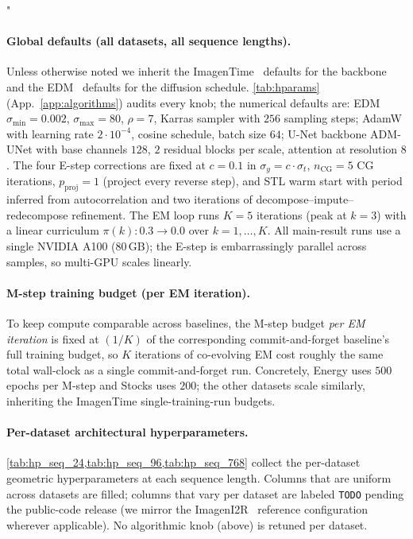 "\documentclass{article}
\theoremstyle{plain}
\theoremstyle{definition}
\theoremstyle{remark}
\begin{document}
\paragraph{Global defaults (all datasets, all sequence lengths).}
Unless otherwise noted we inherit the ImagenTime~\citep{naiman2024imagentime} defaults for the backbone and the EDM~\citep{karras2022edm} defaults for the diffusion schedule. \cref{tab:hparams} (App.~\ref{app:algorithms}) audits every knob; the numerical defaults are: EDM $\sigma_{\min}=0.002$, $\sigma_{\max}=80$, $\rho=7$, Karras sampler with $256$ sampling steps; AdamW with learning rate $2\cdot 10^{-4}$, cosine schedule, batch size $64$; U-Net backbone ADM-UNet with base channels $128$, $2$ residual blocks per scale, attention at resolution $8$. The four E-step corrections are fixed at $c = 0.1$ in $\sigma_y = c \cdot \sigma_t$, $n_{\mathrm{CG}} = 5$ CG iterations, $p_{\mathrm{proj}} = 1$ (project every reverse step), and STL warm start with period inferred from autocorrelation and two iterations of decompose--impute--redecompose refinement. The EM loop runs $K = 5$ iterations (peak at $k = 3$) with a linear curriculum $\pi(k) : 0.3 \to 0.0$ over $k = 1, \ldots, K$. All main-result runs use a single NVIDIA A100 (80\,GB); the E-step is embarrassingly parallel across samples, so multi-GPU scales linearly.

\paragraph{M-step training budget (per EM iteration).}
To keep compute comparable across baselines, the M-step budget \emph{per EM iteration} is fixed at $(1/K)$ of the corresponding commit-and-forget baseline's full training budget, so $K$ iterations of co-evolving EM cost roughly the same total wall-clock as a single commit-and-forget run. Concretely, Energy uses $500$ epochs per M-step and Stocks uses $200$; the other datasets scale similarly, inheriting the ImagenTime single-training-run budgets.

\paragraph{Per-dataset architectural hyperparameters.}
\cref{tab:hp_seq_24,tab:hp_seq_96,tab:hp_seq_768} collect the per-dataset geometric hyperparameters at each sequence length. Columns that are uniform across datasets are filled; columns that vary per dataset are labeled \texttt{TODO} pending the public-code release (we mirror the ImagenI2R~\citep{fadlon2025imageni2r} reference configuration wherever applicable). No algorithmic knob (above) is retuned per dataset.
\end{document}
